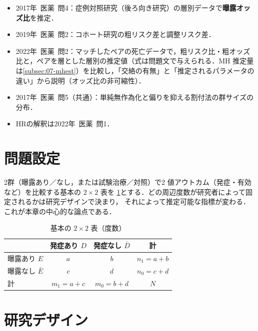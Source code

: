 \documentclass[a4paper,11pt,openany]{ltjsbook}
\newcommand{\kakomon}[2]{\mbox{#1年 医薬 問#2}}
\begin{document}
\begin{exambox}
\begin{itemize}
\item \kakomon{2017}{4}：症例対照研究（後ろ向き研究）の層別データで\textbf{曝露オッズ比}を推定．
\item \kakomon{2019}{2}：コホート研究の粗リスク差と調整リスク差．
\item \kakomon{2022}{2}：マッチしたペアの死亡データで，粗リスク比・粗オッズ比と，ペアを層とした層別の推定値（式は問題文で与えられる．MH 推定量は\cref{subsec:07-mhest}）を比較し，「交絡の有無」と「推定されるパラメータの違い」から説明（オッズ比の非可縮性）．
\item \kakomon{2017}{5}（共通）：単純無作為化と偏りを抑える割付法の群サイズの分布．
\item HRの解釈は\kakomon{2022}{1}．
\end{itemize}
\end{exambox}

\section{問題設定}\label{sec:02-setting}
2群（曝露あり／なし，または試験治療／対照）で2 値アウトカム（発症・有効など）を比較する基本の $2\times2$ 表を
\cref{tab:02-2x2}とする．どの周辺度数が研究者によって固定されるかは研究デザインで決まり，
それによって推定可能な指標が変わる．これが本章の中心的な論点である．
\begin{table}[htbp]
\centering\small
\caption{基本の $2\times2$ 表（度数）}\label{tab:02-2x2}
\begin{tabular}{@{}lccc@{}}
\toprule
 & 発症あり $D$ & 発症なし $\bar D$ & 計\\
\midrule
曝露あり $E$ & $a$ & $b$ & $n_1=a+b$\\
曝露なし $\bar E$ & $c$ & $d$ & $n_0=c+d$\\
\midrule
計 & $m_1=a+c$ & $m_0=b+d$ & $N$\\
\bottomrule
\end{tabular}
\end{table}

\section{研究デザイン}\label{sec:02-design}
\end{document}
